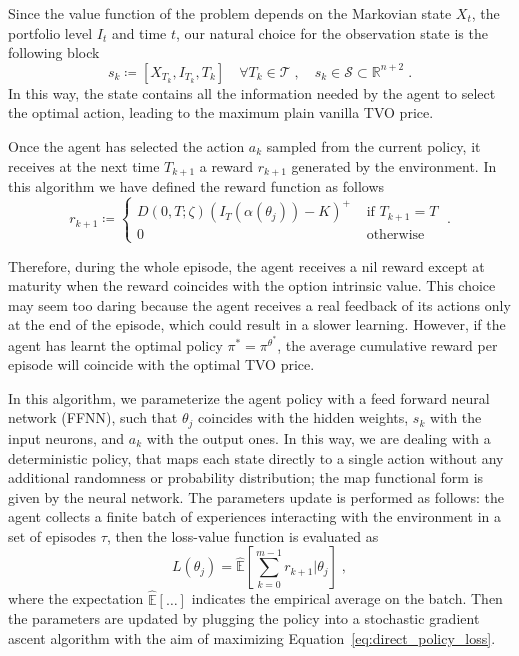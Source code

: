 \documentclass[runningheads]{m2ef}
\begin{document}
	Since the value function of the problem depends on the Markovian state $X_t$, the portfolio level $I_t$ and time $t$, our natural choice for the observation state is the following block
	\begin{equation}
		s_{k} \coloneqq \left[X_{T_k}, I_{T_k}, T_k \right] \quad \forall T_k \in \mathcal{T} \; , \quad s_k \in \mathcal{S} \subset \mathbb{R}^{n+2} \; .
	\label{eq:state}\end{equation}
	In this way, the state contains all the information needed by the agent to select the optimal action, leading to the maximum plain vanilla TVO price. 

	Once the agent has selected the action $a_k$ sampled from the current policy, it receives at the next time $T_{k+1}$ a reward $r_{k+1}$ generated by the environment. In this algorithm we have defined the reward function as follows
	\begin{equation}
		r_{k+1}\coloneqq\left\{\begin{array}{ll}
			D(0,T;\zeta)(I_T(\alpha(\theta_j)) - K)^+ & \text { if } T_{k+1} = T \\
			0 & \text { otherwise }
		\end{array}\right.
	\label{eq:reward1} \; . \end{equation}

	Therefore, during the whole episode, the agent receives a nil reward except at maturity when the reward coincides with the option intrinsic value. This choice may seem too daring because the agent receives a real feedback of its actions only at the end of the episode, which could result in a slower learning. However, if the agent has learnt the optimal policy $\pi^* = \pi^{\theta^*}$, the average cumulative reward per episode will coincide with the optimal TVO price.

	In this algorithm, we parameterize the agent policy with a feed forward neural network (FFNN), such that $\theta_j$ coincides with the hidden weights, $s_k$ with the input neurons, and $a_k$ with the output ones. In this way, we are dealing with a deterministic policy, that maps each state directly to a single action without any additional randomness or probability distribution; the map functional form is given by the neural network. The parameters update is performed as follows: the agent collects a finite batch of experiences interacting with the environment in a set of episodes $\tau$, then the loss-value function is evaluated as
	\begin{equation}
	L(\theta_j) =\hat{\mathbb{E}}\left[ \sum_{k=0}^{m-1} r_{k+1} | \theta_j \right] \; ,
	\label{eq:direct_policy_loss}\end{equation}
	where the expectation $\hat{\mathbb{E}}[\dots]$ indicates the empirical average on the batch. Then the parameters are updated by plugging the policy into a stochastic gradient ascent algorithm \cite{Sutton2018} with the aim of maximizing Equation~\eqref{eq:direct_policy_loss}.
\end{document}
